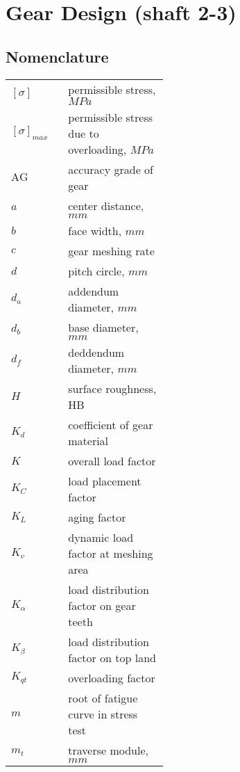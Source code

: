 \chapter{Gear Design (shaft 2-3)}
\section*{Nomenclature}
\begin{tabular}[t]{p{0.1\linewidth}p{0.35\linewidth}}
	$ [\sigma] $ & permissible stress, $ \unit{MPa} $\\
	$ [\sigma]_{max} $ & permissible stress due to overloading, $ \unit{MPa} $\\
	$ \text{AG} $ & accuracy grade of gear\\
	$ a $ & center distance, $ \unit{mm} $\\
	$ b $ & face width, $ \unit{mm} $\\
	$ c $ & gear meshing rate\\
	$ d $ & pitch circle, $ \unit{mm} $\\
	$ d_a $ & addendum diameter, $ \unit{mm} $\\
	$ d_b $ & base diameter, $ \unit{mm} $\\
	$ d_f $ & deddendum diameter, $ \unit{mm} $\\
	$ H $ & surface roughness, HB\\
	$ K_d $ & coefficient of gear material\\	
	$ K $ & overall load factor\\
	$ K_{C} $ & load placement factor\\
	$ K_{L} $ & aging factor\\
	$ K_{v} $ & dynamic load factor at meshing area\\
	$ K_{\alpha} $ & load distribution factor on gear teeth\\
	$ K_{\beta} $ & load distribution factor on top land\\
	$ K_{qt} $ & overloading factor\\
	$ m $ & root of fatigue curve in stress test\\
	$ m_t $ & traverse module, $ \unit{mm} $\\
	
\end{tabular}
